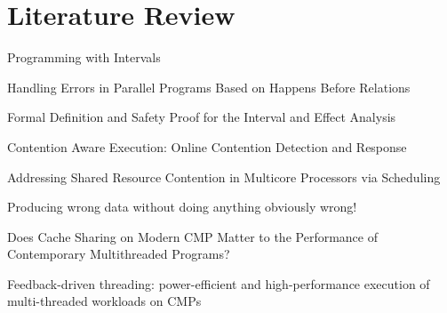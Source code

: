 
\chapter{Literature Review}
\label{cha:literature-review}

Programming with Intervals \cite{programmingwithintervalsmatsakis}

Handling Errors in Parallel Programs Based on Happens Before Relations
\cite{handlingerrorsmatsakis}

Formal Definition and Safety Proof for the Interval and Effect
Analysis \cite{formaldefinitionmatsakis}

Contention Aware Execution: Online Contention Detection and Response
\cite{mars10cgo}

Addressing Shared Resource Contention in Multicore Processors via
Scheduling \cite{sharedresourcecontentionfedorova}

Producing wrong data without doing anything obviously wrong!
\cite{1508275}

Does Cache Sharing on Modern CMP Matter to the Performance of
Contemporary Multithreaded Programs?
\cite{doescachesharingmatteratall}

Feedback-driven threading: power-efficient and high-performance
execution of multi-threaded workloads on CMPs \cite{1346317}
